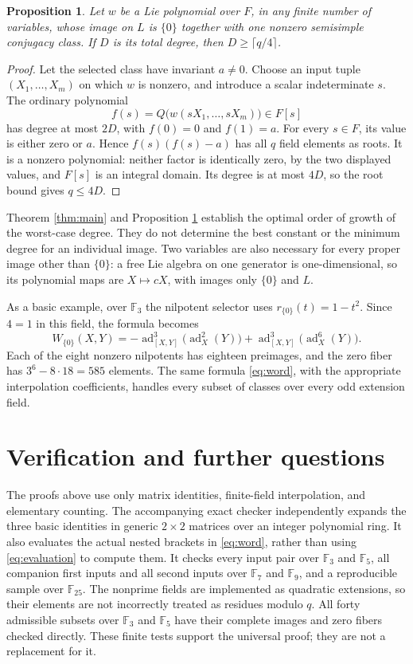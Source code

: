 \documentclass[11pt]{article}
\newtheorem{proposition}[theorem]{Proposition}
\newcommand{\F}{\mathbb F}
\newcommand{\ad}{\operatorname{ad}}
\begin{document}
\begin{proposition}\label{prop:lower}
Let $w$ be a Lie polynomial over $F$, in any finite number of variables,
whose image on $L$ is $\{0\}$ together with one nonzero semisimple conjugacy
class. If $D$ is its total degree, then $D\geq\lceil q/4\rceil$.
\end{proposition}

\begin{proof}
Let the selected class have invariant $a\neq0$. Choose an input tuple
$(X_1,\ldots,X_m)$ on which $w$ is nonzero, and introduce a scalar
indeterminate $s$. The ordinary polynomial
\[
 f(s)=Q\bigl(w(sX_1,\ldots,sX_m)\bigr)\in F[s]
\]
has degree at most $2D$, with $f(0)=0$ and $f(1)=a$.
For every $s\in F$, its value is either zero or $a$. Hence
$f(s)(f(s)-a)$ has all $q$ field elements as roots. It is a nonzero
polynomial: neither factor is identically zero, by the two displayed
values, and $F[s]$ is an integral domain. Its degree is at most $4D$,
so the root bound gives $q\leq4D$.
\end{proof}

Theorem \ref{thm:main} and Proposition \ref{prop:lower} establish the
optimal order of growth of the worst-case degree. They do not determine
the best constant or the minimum degree for an individual image.
Two variables are also necessary for every proper image other than $\{0\}$:
a free Lie algebra on one generator is one-dimensional, so its polynomial
maps are $X\mapsto cX$, with images only $\{0\}$ and $L$.

As a basic example, over $\F_3$ the nilpotent selector uses
$r_{\{0\}}(t)=1-t^2$. Since $4=1$ in this field, the formula becomes
\[
 W_{\{0\}}(X,Y)
 =-\ad_{[X,Y]}^3\bigl(\ad_X^2(Y)\bigr)
  +\ad_{[X,Y]}^3\bigl(\ad_X^6(Y)\bigr).
\]
Each of the eight nonzero nilpotents has eighteen preimages, and the zero
fiber has $3^6-8\cdot18=585$ elements. The same formula \eqref{eq:word},
with the appropriate interpolation coefficients, handles every subset of
classes over every odd extension field.

\section{Verification and further questions}
The proofs above use only matrix identities, finite-field interpolation,
and elementary counting. The accompanying exact checker independently
expands the three basic identities in generic $2\times2$ matrices over
an integer polynomial ring. It also evaluates the actual nested brackets
in \eqref{eq:word}, rather than using \eqref{eq:evaluation} to compute them.
It checks every input pair over $\F_3$ and $\F_5$, all companion first inputs
and all second inputs over $\F_7$ and $\F_9$, and a reproducible sample over
$\F_{25}$. The nonprime fields are implemented as quadratic extensions,
so their elements are not incorrectly treated as residues modulo $q$.
All forty admissible subsets over $\F_3$ and $\F_5$ have their complete
images and zero fibers checked directly. These finite tests support the
universal proof; they are not a replacement for it.
\end{document}
